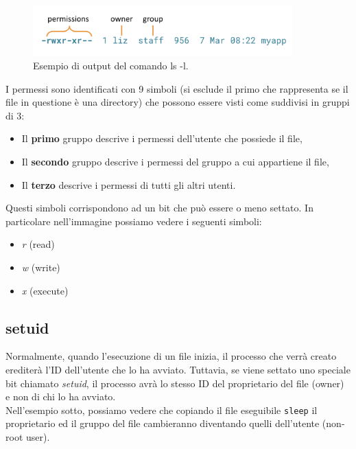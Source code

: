 \begin{figure}[H]
    \centering
    \includegraphics[width=10cm, keepaspectratio]{capitoli/os_security/imgs/permessi.png}
    \caption{Esempio di output del comando ls -l.}
\end{figure}

I permessi sono identificati con 9 simboli (si esclude il primo che rappresenta
se il file in questione è una directory) che possono essere visti come suddivisi
in gruppi di 3:

\begin{itemize}
    \item Il \textbf{primo} gruppo descrive i permessi dell'utente che possiede il file,
    \item Il \textbf{secondo} gruppo descrive i permessi del gruppo a cui appartiene il file,
    \item Il \textbf{terzo} descrive i permessi di tutti gli altri utenti.
\end{itemize}

Questi simboli corrispondono ad un bit che può essere o meno settato. In particolare
nell'immagine possiamo vedere i seguenti simboli:

\begin{itemize}
    \item \textit{r} (read)
    \item \textit{w} (write)
    \item \textit{x} (execute)
\end{itemize}

\subsection{setuid}

Normalmente, quando l'esecuzione di un file inizia, il processo che verrà creato
erediterà l'ID dell'utente che lo ha avviato. Tuttavia, se viene settato uno speciale
bit chiamato \textit{setuid}, il processo avrà lo stesso ID del proprietario
del file (owner) e non di chi lo ha avviato.\\

Nell'esempio sotto, possiamo vedere che copiando il file eseguibile \verb|sleep|
il proprietario ed il gruppo del file cambieranno diventando quelli dell'utente
(non-root user).

